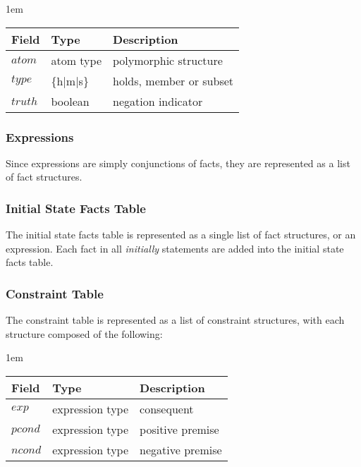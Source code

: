 \documentclass[glov2,twocolumn,final]{svjour2}
\newenvironment{vquote}
  {\begin{list}{}{\leftmargin 1em}\item[]}
  {\end{list}}
\begin{document}
        \begin{vquote}
          \begin{tabular}[t]{|l|l|l|}
            \hline
            \textbf{Field} & \textbf{Type} & \textbf{Description} \\
            \hline
            $atom$ & atom type & polymorphic structure \\
            \hline
            $type$ & \{h$|$m$|$s\} & holds, member or subset \\
            \hline
            $truth$ & boolean & negation indicator \\
            \hline
          \end{tabular}
        \end{vquote}

      \subsubsection{Expressions}

        Since expressions are simply conjunctions of facts, they are
        represented as a list of fact structures.

      \subsubsection{Initial State Facts Table}

        The initial state facts table is represented as a single list of
        fact structures, or an expression. Each fact in all {\em initially}
        statements are added into the initial state facts table.

      \subsubsection{Constraint Table}

        The constraint table is represented as a list of constraint
        structures, with each structure composed of the following:

        \begin{vquote}
          \begin{tabular}[t]{|l|l|l|}
            \hline
            \textbf{Field} & \textbf{Type} & \textbf{Description} \\
            \hline
            $exp$ & expression type & consequent \\
            \hline
            $pcond$ & expression type & positive premise \\
            \hline
            $ncond$ & expression type & negative premise \\
            \hline
          \end{tabular}
        \end{vquote}
\end{document}
